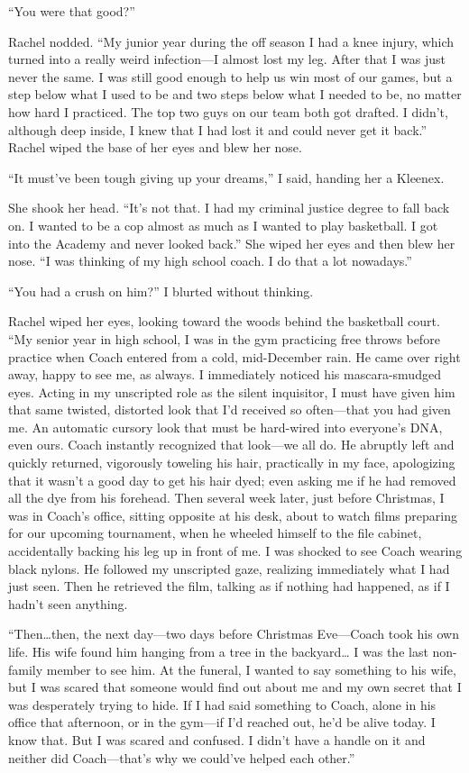 ``You were that good?''

Rachel nodded. ``My junior year during the off season I had a knee
injury, which turned into a really weird infection---I almost lost my
leg. After that I was just never the same. I was still good enough to
help us win most of our games, but a step below what I used to be and
two steps below what I needed to be, no matter how hard I practiced. The
top two guys on our team both got drafted. I didn't, although deep
inside, I knew that I had lost it and could never get it back.'' Rachel
wiped the base of her eyes and blew her nose.

``It must've been tough giving up your dreams,'' I said, handing her a
Kleenex.

She shook her head. ``It's not that. I had my criminal justice degree to
fall back on. I wanted to be a cop almost as much as I wanted to play
basketball. I got into the Academy and never looked back.'' She wiped
her eyes and then blew her nose. ``I was thinking of my high school
coach. I do that a lot nowadays.''

``You had a crush on him?'' I blurted without thinking.

Rachel wiped her eyes, looking toward the woods behind the basketball
court. ``My senior year in high school, I was in the gym practicing free
throws before practice when Coach entered from a cold, mid-December
rain. He came over right away, happy to see me, as always. I immediately
noticed his mascara-smudged eyes. Acting in my unscripted role as the
silent inquisitor, I must have given him that same twisted, distorted
look that I'd received so often---that you had given me. An automatic
cursory look that must be hard-wired into everyone's DNA, even ours.
Coach instantly recognized that look---we all do. He abruptly left and
quickly returned, vigorously toweling his hair, practically in my face,
apologizing that it wasn't a good day to get his hair dyed; even asking
me if he had removed all the dye from his forehead. Then several week
later, just before Christmas, I was in Coach's office, sitting opposite
at his desk, about to watch films preparing for our upcoming tournament,
when he wheeled himself to the file cabinet, accidentally backing his
leg up in front of me. I was shocked to see Coach wearing black nylons.
He followed my unscripted gaze, realizing immediately what I had just
seen. Then he retrieved the film, talking as if nothing had happened, as
if I hadn't seen anything.

``Then\ldots then, the next day---two days before Christmas Eve---Coach
took his own life. His wife found him hanging from a tree in the
backyard\ldots{} I was the last non-family member to see him. At the
funeral, I wanted to say something to his wife, but I was scared that
someone would find out about me and my own secret that I was desperately
trying to hide. If I had said something to Coach, alone in his office
that afternoon, or in the gym---if I'd reached out, he'd be alive today.
I know that. But I was scared and confused. I didn't have a handle on it
and neither did Coach---that's why we could've helped each other.''

